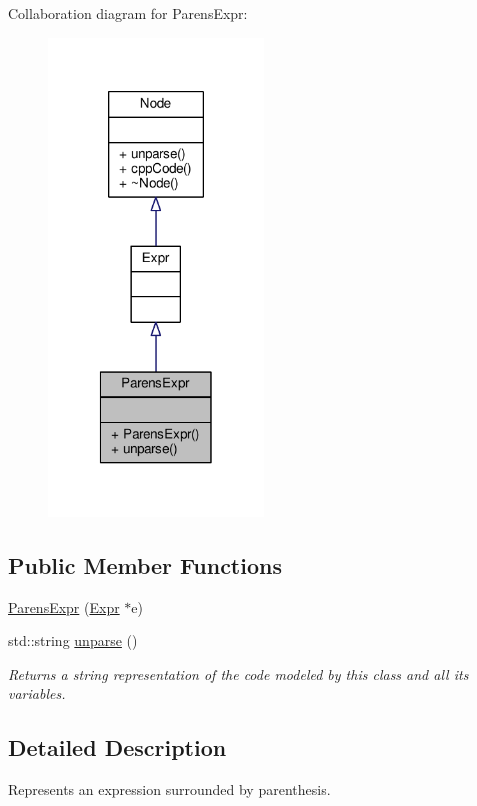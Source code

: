 Collaboration diagram for Parens\-Expr\-:\nopagebreak
\begin{figure}[H]
\begin{center}
\leavevmode
\includegraphics[width=162pt]{classParensExpr__coll__graph}
\end{center}
\end{figure}
\subsection*{Public Member Functions}
\begin{DoxyCompactItemize}
\item 
\hyperlink{classParensExpr_a1f690170bb62040a48c38df1aef7a453}{Parens\-Expr} (\hyperlink{classExpr}{Expr} $\ast$e)
\item 
std\-::string \hyperlink{classParensExpr_ad8eabc69cf42ce3ee92d88caeb40134a}{unparse} ()
\begin{DoxyCompactList}\small\item\em Returns a string representation of the code modeled by this class and all its variables. \end{DoxyCompactList}\end{DoxyCompactItemize}


\subsection{Detailed Description}
Represents an expression surrounded by parenthesis. \par
 

